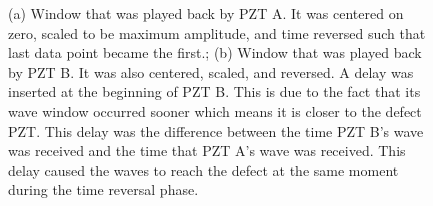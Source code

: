 \documentclass[11pt,letterpaper]{article}%
\begin{document}
 \begin{figure}
\begin{subfigmatrix}{2}
\end{subfigmatrix}

   \caption[all]
   { \label{scaledWindows}
(a) Window that was played back by PZT A. It was centered on zero, scaled to be maximum amplitude, and time reversed such that last data point became the first.;
(b) Window that was played back by PZT B. It was also centered, scaled, and reversed. A delay was inserted at the beginning of PZT B. This is due to the fact that its wave window occurred sooner which means it is closer to the defect PZT. This delay was the difference between the time PZT B's wave was received and the time that PZT A's wave was received. This delay caused the waves to reach the defect at the same moment during the time reversal phase.
 }
   \end{figure}
\end{document}
